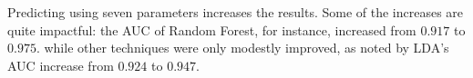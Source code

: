 \documentclass[letterpaper]{report}
\begin{document}
{
\begin{landscape}
Predicting using seven parameters increases the results. Some of the increases are quite impactful: the AUC of Random Forest, for instance, increased from $0.917$ to $0.975$. while other techniques were only modestly improved, as noted by LDA's AUC increase from $0.924$ to $0.947$.

\end{landscape}
}

% 
\end{document}
